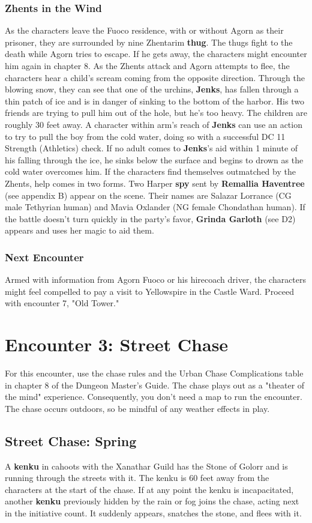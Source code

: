 \documentclass[10pt,a4paper,twoside,twocolumn,openany,nodeprecatedcode]{dndbook}
\begin{document}
\subsubsection{Zhents in the Wind}
As the characters leave the Fuoco residence, with or without Agorn as their prisoner, they are surrounded by nine Zhentarim \textbf{thug}. The thugs fight to the death while Agorn tries to escape. If he gets away, the characters might encounter him again in chapter 8.
As the Zhents attack and Agorn attempts to flee, the characters hear a child's scream coming from the opposite direction. Through the blowing snow, they can see that one of the urchins, \textbf{Jenks}, has fallen through a thin patch of ice and is in danger of sinking to the bottom of the harbor. His two friends are trying to pull him out of the hole, but he's too heavy. The children are roughly 30 feet away. A character within arm's reach of \textbf{Jenks} can use an action to try to pull the boy from the cold water, doing so with a successful DC 11 Strength (Athletics) check. If no adult comes to \textbf{Jenks}'s aid within 1 minute of his falling through the ice, he sinks below the surface and begins to drown as the cold water overcomes him.
If the characters find themselves outmatched by the Zhents, help comes in two forms. Two Harper \textbf{spy} sent by \textbf{Remallia Haventree} (see appendix B) appear on the scene. Their names are Salazar Lorrance (CG male Tethyrian human) and Mavia Oxlander (NG female Chondathan human). If the battle doesn't turn quickly in the party's favor, \textbf{Grinda Garloth} (see D2) appears and uses her magic to aid them.
\subsubsection{Next Encounter}
Armed with information from Agorn Fuoco or his hirecoach driver, the characters might feel compelled to pay a visit to Yellowspire in the Castle Ward. Proceed with encounter 7, "Old Tower."
\section{Encounter 3: Street Chase}
For this encounter, use the chase rules and the Urban Chase Complications table in chapter 8 of the Dungeon Master's Guide. The chase plays out as a "theater of the mind" experience. Consequently, you don't need a map to run the encounter. The chase occurs outdoors, so be mindful of any weather effects in play.
\subsection{Street Chase: Spring}
A \textbf{kenku} in cahoots with the Xanathar Guild has the Stone of Golorr and is running through the streets with it. The kenku is 60 feet away from the characters at the start of the chase.
If at any point the kenku is incapacitated, another \textbf{kenku} previously hidden by the rain or fog joins the chase, acting next in the initiative count. It suddenly appears, snatches the stone, and flees with it.
\end{document}

